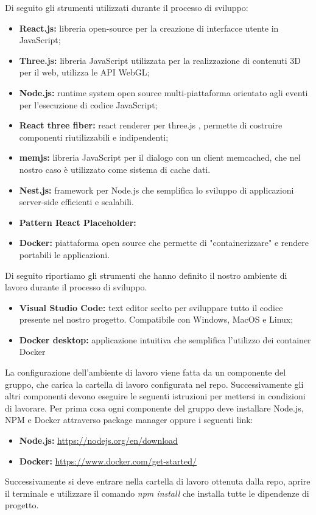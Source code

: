 Di seguito gli strumenti utilizzati durante il processo di sviluppo:
\begin{itemize}
    \item \textbf{React.js:} libreria open-source per la creazione di interfacce utente in JavaScript;
    \item \textbf{Three.js:} libreria JavaScript utilizzata per la realizzazione di contenuti 3D per il web, utilizza le
    API WebGL;
    \item \textbf{Node.js:} runtime system open source multi-piattaforma orientato agli eventi per l’esecuzione
    di codice JavaScript;
    \item \textbf{React three fiber:} react renderer per three.js , permette di costruire componenti riutilizzabili
    e indipendenti;
    \item \textbf{memjs:} libreria JavaScript per il dialogo con un client memcached, che nel nostro caso è utilizzato come sistema di cache dati.
    \item \textbf{Nest.js:} framework per Node.js che semplifica lo sviluppo di applicazioni server-side efficienti e scalabili.
    \item \textbf{Pattern React Placeholder:}
    \item \textbf{Docker:} piattaforma open source che permette di "containerizzare" e rendere portabili le applicazioni.
\end{itemize}

Di seguito riportiamo gli strumenti che hanno definito il nostro ambiente di lavoro durante il processo di
sviluppo.

\begin{itemize}
    \item \textbf{Visual Studio Code:} text editor scelto per sviluppare tutto il codice presente nel nostro progetto.
    Compatibile con Windows, MacOS e Linux;
    \item \textbf{Docker desktop:} applicazione intuitiva che semplifica l'utilizzo dei container Docker 
\end{itemize}

La configurazione dell’ambiente di lavoro viene fatta da un componente del gruppo, che carica la cartella
di lavoro configurata nel repo. Successivamente gli altri componenti devono eseguire le seguenti istruzioni
per mettersi in condizioni di lavorare. Per prima cosa ogni componente del gruppo deve installare Node.js, NPM e Docker
attraverso package manager oppure i seguenti link:
\begin{itemize}
    \item \textbf{Node.js:} \url{https://nodejs.org/en/download}
    \item \textbf{Docker:} \url{https://www.docker.com/get-started/}
\end{itemize}
Successivamente si deve entrare nella cartella di lavoro ottenuta dalla repo, aprire il terminale e utilizzare
il comando \textit{npm install} che installa tutte le dipendenze di progetto.

